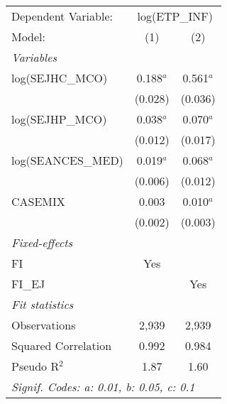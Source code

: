 
\begingroup
\centering
\begin{tabular}{lcc}
   \tabularnewline \midrule \midrule
   Dependent Variable: & \multicolumn{2}{c}{log(ETP\_INF)}\\
   Model:              & (1)         & (2)\\  
   \midrule
   \emph{Variables}\\
   log(SEJHC\_MCO)     & 0.188$^{a}$ & 0.561$^{a}$\\   
                       & (0.028)     & (0.036)\\   
   log(SEJHP\_MCO)     & 0.038$^{a}$ & 0.070$^{a}$\\   
                       & (0.012)     & (0.017)\\   
   log(SEANCES\_MED)   & 0.019$^{a}$ & 0.068$^{a}$\\   
                       & (0.006)     & (0.012)\\   
   CASEMIX             & 0.003       & 0.010$^{a}$\\   
                       & (0.002)     & (0.003)\\   
   \midrule
   \emph{Fixed-effects}\\
   FI                  & Yes         & \\  
   FI\_EJ              &             & Yes\\  
   \midrule
   \emph{Fit statistics}\\
   Observations        & 2,939       & 2,939\\  
   Squared Correlation & 0.992       & 0.984\\  
   Pseudo R$^2$        & 1.87        & 1.60\\  
   \midrule \midrule
   \multicolumn{3}{l}{\emph{Signif. Codes: a: 0.01, b: 0.05, c: 0.1}}\\
\end{tabular}
\par\endgroup


